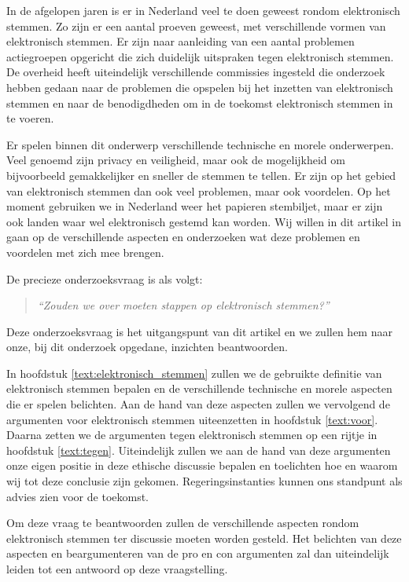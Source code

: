 \documentclass[a4paper]{article}
\begin{document}
In de afgelopen jaren is er in Nederland veel te doen geweest rondom elektronisch stemmen.
Zo zijn er een aantal proeven geweest, met verschillende vormen van elektronisch stemmen.
Er zijn naar aanleiding van een aantal problemen actiegroepen opgericht die zich duidelijk uitspraken tegen elektronisch stemmen.
De overheid heeft uiteindelijk verschillende commissies ingesteld die onderzoek hebben gedaan naar de problemen die opspelen bij het inzetten van elektronisch stemmen en naar de benodigdheden om in de toekomst elektronisch stemmen in te voeren.

Er spelen binnen dit onderwerp verschillende technische en morele onderwerpen.
Veel genoemd zijn privacy en veiligheid, maar ook de mogelijkheid om bijvoorbeeld gemakkelijker en sneller de stemmen te tellen.
Er zijn op het gebied van elektronisch stemmen dan ook veel problemen, maar ook voordelen.
Op het moment gebruiken we in Nederland weer het papieren stembiljet, maar er zijn ook landen waar wel elektronisch gestemd kan worden.
Wij willen in dit artikel in gaan op de verschillende aspecten en onderzoeken wat deze problemen en voordelen met zich mee brengen.

De precieze onderzoeksvraag is als volgt:
\begin{quote}
\emph{``Zouden we over moeten stappen op elektronisch stemmen?''}
\end{quote}
Deze onderzoeksvraag is het uitgangspunt van dit artikel en we zullen hem naar onze, bij dit onderzoek opgedane, inzichten beantwoorden. 

In hoofdstuk \ref{text:elektronisch_stemmen} zullen we de gebruikte definitie van elektronisch stemmen bepalen en de verschillende technische en morele aspecten die er spelen belichten.
Aan de hand van deze aspecten zullen we vervolgend de argumenten voor elektronisch stemmen uiteenzetten in hoofdstuk \ref{text:voor}.
Daarna zetten we de argumenten tegen elektronisch stemmen op een rijtje in hoofdstuk \ref{text:tegen}.
Uiteindelijk zullen we aan de hand van deze argumenten onze eigen positie in deze ethische discussie bepalen en toelichten hoe en waarom wij tot deze conclusie zijn gekomen. 
Regeringsinstanties kunnen ons standpunt als advies zien voor de toekomst. 

Om deze vraag te beantwoorden zullen de verschillende aspecten rondom elektronisch stemmen ter discussie moeten worden gesteld.
Het belichten van deze aspecten en beargumenteren van de pro en con argumenten zal dan uiteindelijk leiden tot een antwoord op deze vraagstelling.
\end{document}
